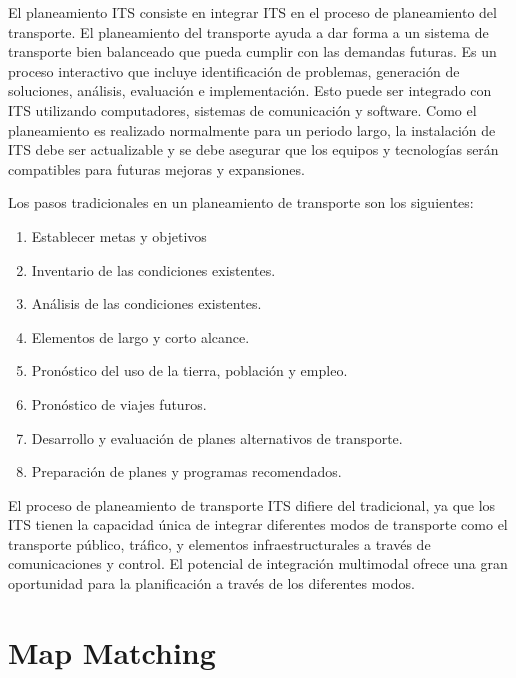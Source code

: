 \documentclass[final,fmstyle]{fpunathesis}
\begin{document}
El planeamiento ITS consiste en integrar ITS en el proceso de planeamiento del transporte. El planeamiento del transporte ayuda a dar forma a un sistema de transporte bien balanceado que pueda cumplir con las demandas futuras. Es un proceso interactivo que incluye identificación de problemas, generación de soluciones, análisis, evaluación e implementación. Esto puede ser integrado con ITS utilizando computadores, sistemas de comunicación y software. Como el planeamiento es realizado normalmente para un periodo largo, la instalación de ITS debe ser actualizable y se debe asegurar que los equipos y tecnologías serán compatibles para futuras mejoras y expansiones.

Los pasos tradicionales en un planeamiento de transporte son los siguientes:

\begin{enumerate}
\item Establecer metas y objetivos

\item Inventario de las condiciones existentes.

\item Análisis de las condiciones existentes.

\item Elementos de largo y corto alcance.

\item Pronóstico del uso de la tierra, población y empleo.

\item Pronóstico de viajes futuros.

\item Desarrollo y evaluación de planes alternativos de transporte.

\item Preparación de planes y programas recomendados.
\end{enumerate}

El proceso de planeamiento de transporte ITS difiere del tradicional, ya que los ITS tienen la capacidad única de integrar diferentes modos de transporte como el transporte público, tráfico, y elementos infraestructurales a través de comunicaciones y control. El potencial de integración multimodal ofrece una gran oportunidad para la planificación a través de los diferentes modos.

\chapter{Map Matching}
\end{document}
